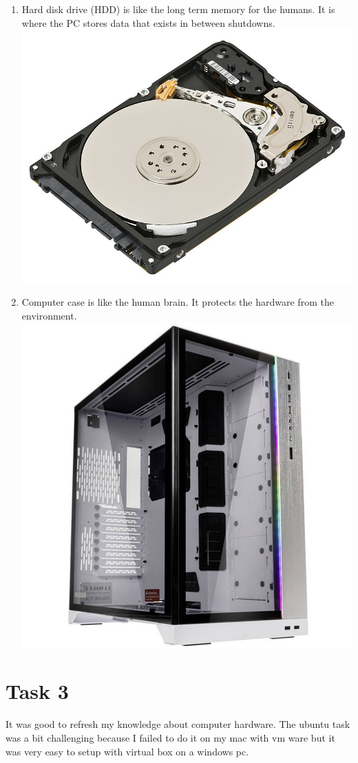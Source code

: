 \documentclass{article}
\begin{document}
\begin{enumerate}
	\item Hard disk drive (HDD) is like the long term memory for the humans. It is where the PC stores data that exists in between shutdowns.
	\includegraphics[width=\textwidth,height=\textheight,keepaspectratio]{hdd}
	\item Computer case is like the human brain. It protects the hardware from the environment.
	\includegraphics[width=\textwidth,height=\textheight,keepaspectratio]{chassi}
\end{enumerate}

\section {Task 3}
It was good to refresh my knowledge about computer hardware. 
The ubuntu task was a bit challenging because I failed to do it on my mac with vm ware but it was very easy to setup with virtual box on a windows pc.
\end{document}
